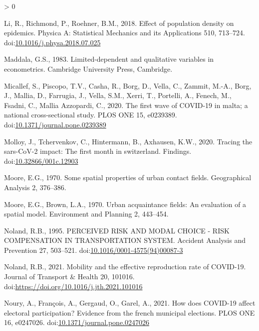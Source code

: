 \documentclass[]{elsarticle} %
\newlength{\cslhangindent}
\newenvironment{CSLReferences}[2] %
 {%
  \setlength{\parindent}{0pt}
  \ifodd #1 \everypar{\setlength{\hangindent}{\cslhangindent}}\ignorespaces\fi
  \ifnum #2 > 0
  \setlength{\parskip}{#2\baselineskip}
  \fi
 }%
 {}
\begin{document}
\begin{CSLReferences}{1}{0}
\leavevmode\hypertarget{ref-Li2018effect}{}%
Li, R., Richmond, P., Roehner, B.M., 2018. Effect of population density
on epidemics. Physica A: Statistical Mechanics and its Applications 510,
713--724.
doi:\href{https://doi.org/10.1016/j.physa.2018.07.025}{10.1016/j.physa.2018.07.025}

\leavevmode\hypertarget{ref-Maddala1983limited}{}%
Maddala, G.S., 1983. Limited-dependent and qualitative variables in
econometrics. Cambridge University Press, Cambridge.

\leavevmode\hypertarget{ref-Micallef2020first}{}%
Micallef, S., Piscopo, T.V., Casha, R., Borg, D., Vella, C., Zammit,
M.-A., Borg, J., Mallia, D., Farrugia, J., Vella, S.M., Xerri, T.,
Portelli, A., Fenech, M., Fsadni, C., Mallia Azzopardi, C., 2020. The
first wave of COVID-19 in malta; a national cross-sectional study. PLOS
ONE 15, e0239389.
doi:\href{https://doi.org/10.1371/journal.pone.0239389}{10.1371/journal.pone.0239389}

\leavevmode\hypertarget{ref-Molloy2020Tracing}{}%
Molloy, J., Tchervenkov, C., Hintermann, B., Axhausen, K.W., 2020.
Tracing the sars-CoV-2 impact: The first month in switzerland. Findings.
doi:\href{https://doi.org/10.32866/001c.12903}{10.32866/001c.12903}

\leavevmode\hypertarget{ref-Moore1970some}{}%
Moore, E.G., 1970. Some spatial properties of urban contact fields.
Geographical Analysis 2, 376--386.

\leavevmode\hypertarget{ref-Moore1970urban}{}%
Moore, E.G., Brown, L.A., 1970. Urban acquaintance fields: An evaluation
of a spatial model. Environment and Planning 2, 443--454.

\leavevmode\hypertarget{ref-Noland1995perceived}{}%
Noland, R.B., 1995. PERCEIVED RISK AND MODAL CHOICE - RISK COMPENSATION
IN TRANSPORTATION SYSTEM. Accident Analysis and Prevention 27, 503--521.
doi:\href{https://doi.org/10.1016/0001-4575(94)00087-3}{10.1016/0001-4575(94)00087-3}

\leavevmode\hypertarget{ref-Noland2021mobility}{}%
Noland, R.B., 2021. Mobility and the effective reproduction rate of
COVID-19. Journal of Transport \& Health 20, 101016.
doi:\url{https://doi.org/10.1016/j.jth.2021.101016}

\leavevmode\hypertarget{ref-Noury2021how}{}%
Noury, A., François, A., Gergaud, O., Garel, A., 2021. How does COVID-19
affect electoral participation? Evidence from the french municipal
elections. PLOS ONE 16, e0247026.
doi:\href{https://doi.org/10.1371/journal.pone.0247026}{10.1371/journal.pone.0247026}


\end{CSLReferences}
\end{document}

